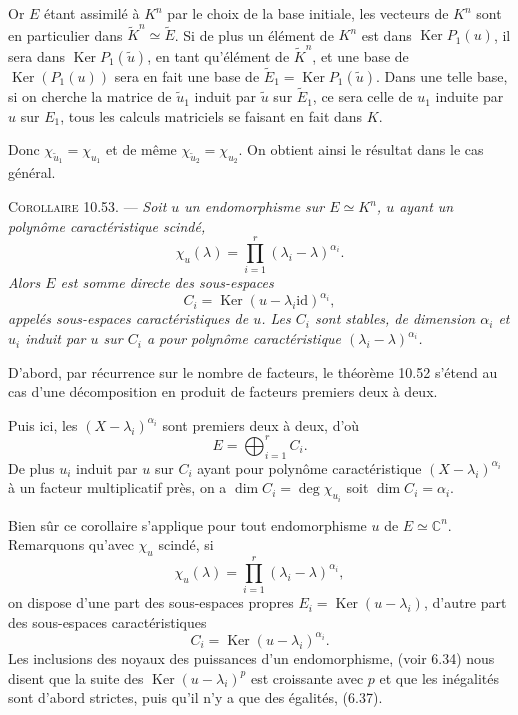 Or $E$ étant assimilé à $K^n$ par le choix de la base initiale, les vecteurs de $K^n$ sont en particulier dans $\widetilde K^n\simeq\widetilde E$. Si de plus un élément de $K^n$ est dans $\operatorname{Ker}P_1(u)$, il sera dans $\operatorname{Ker}P_1(\widetilde u)$, en tant qu'élément de $\widetilde K^n$, et une base de $\operatorname{Ker}(P_1(u))$ sera en fait une base de $\widetilde E_1=\operatorname{Ker}P_1(\widetilde u)$. Dans une telle base, si on cherche la matrice de $\widetilde u_1$ induit par $\widetilde u$ sur $\widetilde E_1$, ce sera celle de $u_1$ induite par $u$ sur $E_1$, tous les calculs matriciels se faisant en fait dans $K$.

Donc $\chi_{\widetilde u_1}=\chi_{u_1}$ et de même $\chi_{\widetilde u_2}=\chi_{u_2}$. On obtient ainsi le résultat dans le cas général. \bookend

\medskip\noindent\textsc{Corollaire 10.53.} --- \emph{Soit $u$ un endomorphisme sur $E\simeq K^n$, $u$ ayant un polynôme caractéristique scindé,
\[
\chi_u(\lambda)=\prod_{i=1}^r(\lambda_i-\lambda)^{\alpha_i}.
\]
Alors $E$ est somme directe des sous-espaces
\[
C_i=\operatorname{Ker}(u-\lambda_i\mathrm{id})^{\alpha_i},
\]
appelés sous-espaces caractéristiques de $u$. Les $C_i$ sont stables, de dimension $\alpha_i$ et $u_i$ induit par $u$ sur $C_i$ a pour polynôme caractéristique $(\lambda_i-\lambda)^{\alpha_i}$.}

D'abord, par récurrence sur le nombre de facteurs, le théorème 10.52 s'étend au cas d'une décomposition en produit de facteurs premiers deux à deux.

Puis ici, les $(X-\lambda_i)^{\alpha_i}$ sont premiers deux à deux, d'où
\[
E=\bigoplus_{i=1}^r C_i.
\]
De plus $u_i$ induit par $u$ sur $C_i$ ayant pour polynôme caractéristique $(X-\lambda_i)^{\alpha_i}$ à un facteur multiplicatif près, on a $\dim C_i=\deg\chi_{u_i}$ soit $\dim C_i=\alpha_i$. \bookend

Bien sûr ce corollaire s'applique pour tout endomorphisme $u$ de $E\simeq\mathbb C^n$. Remarquons qu'avec $\chi_u$ scindé, si
\[
\chi_u(\lambda)=\prod_{i=1}^r(\lambda_i-\lambda)^{\alpha_i},
\]
on dispose d'une part des sous-espaces propres $E_i=\operatorname{Ker}(u-\lambda_i)$, d'autre part des sous-espaces caractéristiques
\[
C_i=\operatorname{Ker}(u-\lambda_i)^{\alpha_i}.
\]
Les inclusions des noyaux des puissances d'un endomorphisme, (voir 6.34) nous disent que la suite des $\operatorname{Ker}(u-\lambda_i)^p$ est croissante avec $p$ et que les inégalités sont d'abord strictes, puis qu'il n'y a que des égalités, (6.37).

